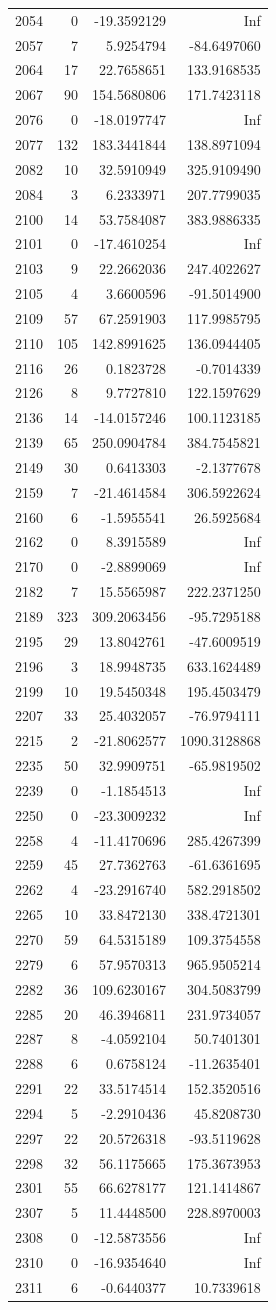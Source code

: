 \documentclass[
]{article}
\begin{document}
\begin{longtable}[]{@{}lrrr@{}}
2054 & 0 & -19.3592129 & Inf\tabularnewline
2057 & 7 & 5.9254794 & -84.6497060\tabularnewline
2064 & 17 & 22.7658651 & 133.9168535\tabularnewline
2067 & 90 & 154.5680806 & 171.7423118\tabularnewline
2076 & 0 & -18.0197747 & Inf\tabularnewline
2077 & 132 & 183.3441844 & 138.8971094\tabularnewline
2082 & 10 & 32.5910949 & 325.9109490\tabularnewline
2084 & 3 & 6.2333971 & 207.7799035\tabularnewline
2100 & 14 & 53.7584087 & 383.9886335\tabularnewline
2101 & 0 & -17.4610254 & Inf\tabularnewline
2103 & 9 & 22.2662036 & 247.4022627\tabularnewline
2105 & 4 & 3.6600596 & -91.5014900\tabularnewline
2109 & 57 & 67.2591903 & 117.9985795\tabularnewline
2110 & 105 & 142.8991625 & 136.0944405\tabularnewline
2116 & 26 & 0.1823728 & -0.7014339\tabularnewline
2126 & 8 & 9.7727810 & 122.1597629\tabularnewline
2136 & 14 & -14.0157246 & 100.1123185\tabularnewline
2139 & 65 & 250.0904784 & 384.7545821\tabularnewline
2149 & 30 & 0.6413303 & -2.1377678\tabularnewline
2159 & 7 & -21.4614584 & 306.5922624\tabularnewline
2160 & 6 & -1.5955541 & 26.5925684\tabularnewline
2162 & 0 & 8.3915589 & Inf\tabularnewline
2170 & 0 & -2.8899069 & Inf\tabularnewline
2182 & 7 & 15.5565987 & 222.2371250\tabularnewline
2189 & 323 & 309.2063456 & -95.7295188\tabularnewline
2195 & 29 & 13.8042761 & -47.6009519\tabularnewline
2196 & 3 & 18.9948735 & 633.1624489\tabularnewline
2199 & 10 & 19.5450348 & 195.4503479\tabularnewline
2207 & 33 & 25.4032057 & -76.9794111\tabularnewline
2215 & 2 & -21.8062577 & 1090.3128868\tabularnewline
2235 & 50 & 32.9909751 & -65.9819502\tabularnewline
2239 & 0 & -1.1854513 & Inf\tabularnewline
2250 & 0 & -23.3009232 & Inf\tabularnewline
2258 & 4 & -11.4170696 & 285.4267399\tabularnewline
2259 & 45 & 27.7362763 & -61.6361695\tabularnewline
2262 & 4 & -23.2916740 & 582.2918502\tabularnewline
2265 & 10 & 33.8472130 & 338.4721301\tabularnewline
2270 & 59 & 64.5315189 & 109.3754558\tabularnewline
2279 & 6 & 57.9570313 & 965.9505214\tabularnewline
2282 & 36 & 109.6230167 & 304.5083799\tabularnewline
2285 & 20 & 46.3946811 & 231.9734057\tabularnewline
2287 & 8 & -4.0592104 & 50.7401301\tabularnewline
2288 & 6 & 0.6758124 & -11.2635401\tabularnewline
2291 & 22 & 33.5174514 & 152.3520516\tabularnewline
2294 & 5 & -2.2910436 & 45.8208730\tabularnewline
2297 & 22 & 20.5726318 & -93.5119628\tabularnewline
2298 & 32 & 56.1175665 & 175.3673953\tabularnewline
2301 & 55 & 66.6278177 & 121.1414867\tabularnewline
2307 & 5 & 11.4448500 & 228.8970003\tabularnewline
2308 & 0 & -12.5873556 & Inf\tabularnewline
2310 & 0 & -16.9354640 & Inf\tabularnewline
2311 & 6 & -0.6440377 & 10.7339618\tabularnewline

\end{longtable}
\end{document}
